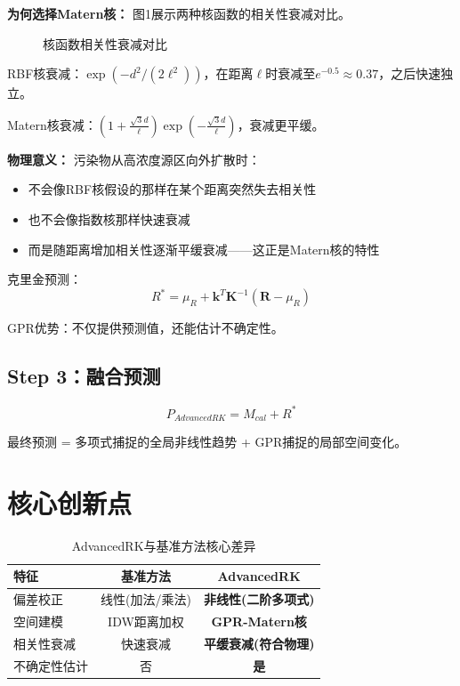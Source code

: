 \documentclass[UTF8, a4paper, 12pt]{article}
\begin{document}
\textbf{为何选择Matern核：} 图1展示两种核函数的相关性衰减对比。

\begin{figure}[htbp]
\centering
\caption{核函数相关性衰减对比}
\label{fig:kernel}
\end{figure}

RBF核衰减：$\exp(-d^2/(2\ell^2))$，在距离$\ell$时衰减至$e^{-0.5} \approx 0.37$，之后快速独立。

Matern核衰减：$\left(1 + \frac{\sqrt{3}d}{\ell}\right) \exp\left(-\frac{\sqrt{3}d}{\ell}\right)$，衰减更平缓。

\textbf{物理意义：} 污染物从高浓度源区向外扩散时：
\begin{itemize}
    \item 不会像RBF核假设的那样在某个距离突然失去相关性
    \item 也不会像指数核那样快速衰减
    \item 而是随距离增加相关性逐渐平缓衰减——这正是Matern核的特性
\end{itemize}

克里金预测：
\begin{equation}
R^* = \mu_R + \mathbf{k}^T \mathbf{K}^{-1} (\mathbf{R} - \mu_R)
\end{equation}

GPR优势：不仅提供预测值，还能估计不确定性。

\subsection{Step 3：融合预测}

\begin{equation}
P_{AdvancedRK} = M_{cal} + R^*
\end{equation}

最终预测 = 多项式捕捉的全局非线性趋势 + GPR捕捉的局部空间变化。

\section{核心创新点}

\begin{table}[htbp]
\centering
\caption{AdvancedRK与基准方法核心差异}
\begin{tabular}{@{}lcc@{}}
\toprule
特征 & 基准方法 & AdvancedRK \\
\midrule
偏差校正 & 线性(加法/乘法) & \textbf{非线性(二阶多项式)} \\
空间建模 & IDW距离加权 & \textbf{GPR-Matern核} \\
相关性衰减 & 快速衰减 & \textbf{平缓衰减(符合物理)} \\
不确定性估计 & 否 & \textbf{是} \\
\end{tabular}
\end{table}
\end{document}
